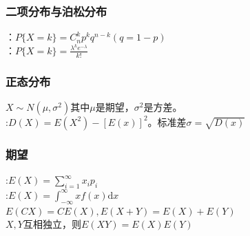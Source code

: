 \documentclass[a4paper]{book}
\begin{document}
\subsubsection{二项分布与泊松分布}
：$P\{X=k\}=C_n^{k} p^{k} q^{n-k}(q=1-p)$\\
：$P\{X=k\}=\frac{\lambda^{k}e^{-\lambda}}{k!}$
\subsubsection{正态分布}
$X\sim N(\mu,\sigma^2)$其中$\mu$是期望，$\sigma^2$是方差。\\
:$D(X)=E(X^2)-[E(x)]^2$。标准差$\sigma=\sqrt{D(x)}$
\subsubsection{期望}
:$E(X)=\displaystyle\sum_{i=1}^{\infty}x_i p_i$\\
:$E(X)=\int_{-\infty}^{\infty}xf(x)\text{d}x$\\
\indent$E(CX)=CE(X),E(X+Y)=E(X)+E(Y)$\\
$X,Y$互相独立，则$E(XY)=E(X)E(Y)$
\end{document}

